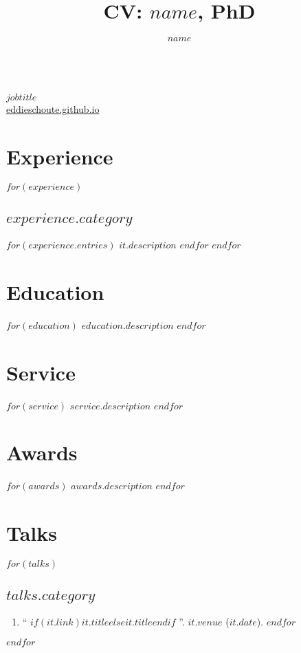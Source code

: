 \documentclass[11pt]{article}
\title{CV: $name$, PhD}
\author{$name$}
\date{}
\makeatletter
\renewcommand\maketitle{
		{%
			\noindent {\Large\sffamily\bfseries \@author, PhD}\\
			{\large\normalfont\itshape $jobtitle$}\\
			{\normalsize\sffamily\upshape \href{https://eddieschoute.github.io}{eddieschoute.github.io}}
		}
	}
\makeatother
\begin{document}
%
\thispagestyle{empty}

\maketitle

\section{Experience}
$for(experience)$
\subsection{$experience.category$}
$for(experience.entries)$
$it.description$
$endfor$
$endfor$

\section{Education}
$for(education)$
$education.description$
$endfor$

\vspace{14pt}
\section{Service}
$for(service)$
$service.description$
$endfor$

\section{Awards}
$for(awards)$
$awards.description$
$endfor$

\section{Talks}
$for(talks)$
\subsection{$talks.category$}
\begin{enumerate}
$for(talks.entries)$
\item ``%
	$if(it.link)$\href{$it.link$}{$it.title$}$else$$it.title$$endif$%
	''. $it.venue$ ($it.date$).
$endfor$
\end{enumerate}
$endfor$
\end{document}
